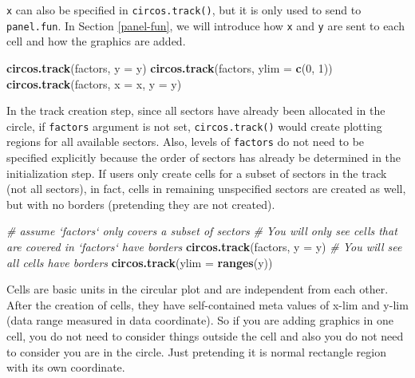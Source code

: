 \documentclass[]{book}
\newenvironment{Shaded}{\begin{snugshade}}{\end{snugshade}}
\newcommand{\KeywordTok}[1]{\textcolor[rgb]{0.13,0.29,0.53}{\textbf{#1}}}
\newcommand{\DataTypeTok}[1]{\textcolor[rgb]{0.13,0.29,0.53}{#1}}
\newcommand{\DecValTok}[1]{\textcolor[rgb]{0.00,0.00,0.81}{#1}}
\newcommand{\CommentTok}[1]{\textcolor[rgb]{0.56,0.35,0.01}{\textit{#1}}}
\newcommand{\NormalTok}[1]{#1}
\begin{document}
\texttt{x} can also be specified in \texttt{circos.track()}, but it is
only used to send to \texttt{panel.fun}. In Section \ref{panel-fun}, we
will introduce how \texttt{x} and \texttt{y} are sent to each cell and
how the graphics are added.

\begin{Shaded}
\begin{Highlighting}[]
\KeywordTok{circos.track}\NormalTok{(factors, }\DataTypeTok{y =}\NormalTok{ y)}
\KeywordTok{circos.track}\NormalTok{(factors, }\DataTypeTok{ylim =} \KeywordTok{c}\NormalTok{(}\DecValTok{0}\NormalTok{, }\DecValTok{1}\NormalTok{))}
\KeywordTok{circos.track}\NormalTok{(factors, }\DataTypeTok{x =}\NormalTok{ x, }\DataTypeTok{y =}\NormalTok{ y)}
\end{Highlighting}
\end{Shaded}

In the track creation step, since all sectors have already been
allocated in the circle, if \texttt{factors} argument is not set,
\texttt{circos.track()} would create plotting regions for all available
sectors. Also, levels of \texttt{factors} do not need to be specified
explicitly because the order of sectors has already be determined in the
initialization step. If users only create cells for a subset of sectors
in the track (not all sectors), in fact, cells in remaining unspecified
sectors are created as well, but with no borders (pretending they are
not created).

\begin{Shaded}
\begin{Highlighting}[]
\CommentTok{# assume `factors` only covers a subset of sectors}
\CommentTok{# You will only see cells that are covered in `factors` have borders}
\KeywordTok{circos.track}\NormalTok{(factors, }\DataTypeTok{y =}\NormalTok{ y)}
\CommentTok{# You will see all cells have borders}
\KeywordTok{circos.track}\NormalTok{(}\DataTypeTok{ylim =} \KeywordTok{ranges}\NormalTok{(y))}
\end{Highlighting}
\end{Shaded}

Cells are basic units in the circular plot and are independent from each
other. After the creation of cells, they have self-contained meta values
of x-lim and y-lim (data range measured in data coordinate). So if you
are adding graphics in one cell, you do not need to consider things
outside the cell and also you do not need to consider you are in the
circle. Just pretending it is normal rectangle region with its own
coordinate.
\end{document}
